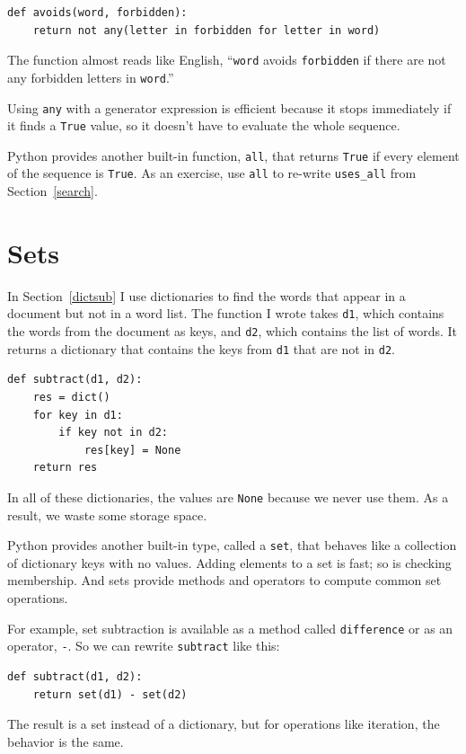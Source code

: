 \documentclass[10pt]{book}
\begin{document}
\begin{verbatim}
def avoids(word, forbidden):
    return not any(letter in forbidden for letter in word)
\end{verbatim}
%
The function almost reads like English, ``{\tt word} avoids
{\tt forbidden} if there are not any forbidden letters in {\tt word}.''

Using {\tt any} with a generator expression is efficient because
it stops immediately if it finds a {\tt True} value,
so it doesn't have to evaluate the whole sequence.

Python provides another built-in function, {\tt all}, that returns
{\tt True} if every element of the sequence is {\tt True}.  As
an exercise, use {\tt all} to re-write \verb"uses_all" from
Section~\ref{search}.


\section{Sets}
\label{sets}

In Section~\ref{dictsub} I use dictionaries to find the words
that appear in a document but not in a word list.  The function
I wrote takes {\tt d1}, which contains the words from the document
as keys, and {\tt d2}, which contains the list of words.  It
returns a dictionary that contains the keys from {\tt d1} that
are not in {\tt d2}.

\begin{verbatim}
def subtract(d1, d2):
    res = dict()
    for key in d1:
        if key not in d2:
            res[key] = None
    return res
\end{verbatim}
%
In all of these dictionaries, the values are {\tt None} because
we never use them.  As a result, we waste some storage space.

Python provides another built-in type, called a {\tt set}, that
behaves like a collection of dictionary keys with no values.  Adding
elements to a set is fast; so is checking membership.  And sets
provide methods and operators to compute common set operations.

For example, set subtraction is available as a method called
{\tt difference} or as an operator, {\tt -}.  So we can rewrite
{\tt subtract} like this:

\begin{verbatim}
def subtract(d1, d2):
    return set(d1) - set(d2)
\end{verbatim}
%
The result is a set instead of a dictionary, but for operations like
iteration, the behavior is the same.
\end{document}
